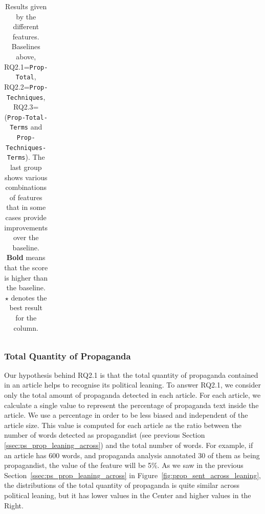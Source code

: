 \begin{table}[!htbp]
\begin{tabular}{l|rr|rr}
    \end{tabular}
    \caption{Results given by the different features. Baselines above, RQ2.1=\texttt{Prop-Total}, RQ2.2=\texttt{Prop-Techniques}, RQ2.3= (\texttt{Prop-Total-Terms} and \texttt{Prop-Techniques-Terms}). The last group shows various combinations of features that in some cases provide improvements over the baseline. \textbf{Bold} means that the score is higher than the baseline. $\star$ denotes the best result for the column.}
    \label{tab:results_prop_features_classifier}
\end{table}

\subsubsection{Total Quantity of Propaganda}


Our hypothesis behind RQ2.1 is that the total quantity of propaganda contained in an article helps to recognise its political leaning. 
To answer RQ2.1, we consider only the total amount of propaganda detected in each article. For each article, we calculate a single value to represent the percentage of propaganda text inside the article. %
We use a percentage in order to be less biased and independent of the article size.
This value is computed for each article as the ratio between the number of words detected as propagandist (see previous Section \ref{ssec:ps_prop_leaning_across}) and the total number of words. For example, if an article has 600 words, and propaganda analysis annotated 30 of them as being propagandist, the value of the feature will be 5\%.  
As we saw in the previous Section~\ref{ssec:ps_prop_leaning_across} in Figure~\ref{fig:prop_sent_across_leaning}, the distributions of the total quantity of propaganda is quite similar across political leaning, but it has lower values in the Center and higher values in the Right.

